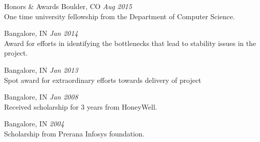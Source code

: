 \begin{category}{Honors \& Awards}
 Boulder, CO \hfill \textit{Aug 2015}\\
One time university fellowship from the Department of Computer Science.

 Bangalore, IN \hfill \textit{Jan 2014}\\
Award for efforts in identifying the bottlenecks that lead to stability issues in the project.

 Bangalore, IN \hfill \textit{Jan 2013}\\
Spot award for extra­ordinary efforts towards delivery of project

 Bangalore, IN \hfill \textit{Jan 2008}\\
Received scholarship for 3 years from HoneyWell.

 Bangalore, IN \hfill \textit{2004}\\
Scholarship from Prerana Infosys foundation.

\end{category}
